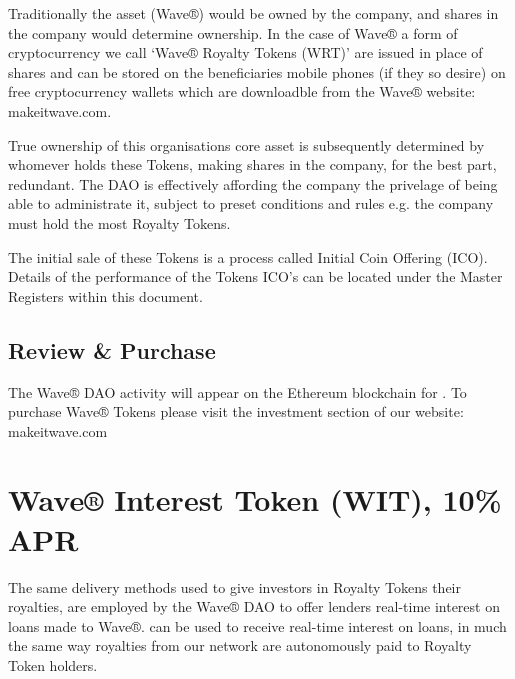 \documentclass[letterpaper,10pt,openany,oneside,english]{sphinxmanual}
\begin{document}
Traditionally the asset (Wave®) would be owned by the company, and shares in the company would determine ownership.
In the case of Wave® a form of cryptocurrency we call ‘Wave® Royalty Tokens (WRT)’ are issued in place of shares and can be stored on the beneficiaries mobile phones (if they so desire) on free cryptocurrency wallets which are downloadble from the Wave®  website: makeitwave.com.

True ownership of this organisations core asset is subsequently determined by whomever holds these Tokens, making shares in the company, for the best part, redundant.
The DAO is effectively affording the company the privelage of being able to administrate it, subject to preset conditions and rules e.g. the company must hold the most Royalty Tokens.

The initial sale of these Tokens is a process called Initial Coin Offering (ICO).
Details of the performance of the Tokens ICO’s can be located under the Master Registers within this document.


\section{Review \& Purchase}
\label{\detokenize{introduction:review-purchase}}
The Wave® DAO activity will appear on the Ethereum blockchain for .
To purchase Wave® Tokens please visit the investment section of our website: makeitwave.com


\chapter{Wave® Interest Token (WIT), 10\% APR}
\label{\detokenize{wit-detail:wave-interest-token-wit-10-apr}}\label{\detokenize{wit-detail::doc}}
The same delivery methods used to give investors in Royalty Tokens their royalties, are employed by the Wave® DAO to offer lenders real-time interest on loans made to Wave®.
 can be used to receive real-time interest on loans, in much the same way royalties from our network are autonomously paid to Royalty Token holders.
\end{document}
